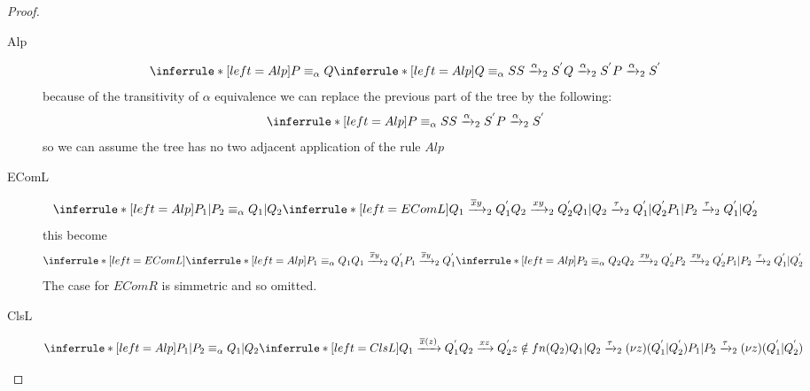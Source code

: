 \begin{proof}
\begin{description}
\begin{itemize}
\begin{description}
	  \item[Alp]
	    \[
	      \inferrule* [left=Alp]{
		  P\equiv_{\alpha}Q
		\\
		  \inferrule* [left=Alp]{
		      Q\equiv_{\alpha}S
		    \\
		      S\xrightarrow{\alpha}_{2}S^{'}
		  }{
		    Q \xrightarrow{\alpha}_{2} S^{'}
		  }
	      }{
		P \xrightarrow{\alpha}_{2} S^{'}
	      }
	    \]
	    because of the transitivity of $\alpha$ equivalence we can replace the previous part of the tree by the following:
	    \[
	      \inferrule* [left=Alp]{
		  P\equiv_{\alpha}S
		\\
		  S \xrightarrow{\alpha}_{2} S^{'}
	      }{
		P \xrightarrow{\alpha}_{2} S^{'}
	      }
	    \]
	    so we can assume the tree has no two adjacent application of the rule $Alp$
	  \item[EComL]
	    \[
	      \inferrule* [left=Alp]{
		  P_{1}|P_{2}\equiv_{\alpha}Q_{1}|Q_{2}
		\\
		  \inferrule* [left=EComL]{
		      Q_{1}\xrightarrow{\overline{x}y}_{2}Q_{1}^{'}
		    \\
		      Q_{2}\xrightarrow{xy}_{2}Q_{2}^{'}
		  }{
		    Q_{1}|Q_{2} \xrightarrow{\tau}_{2} Q_{1}^{'}|Q_{2}^{'}
		  }
	      }{
		P_{1}|P_{2} \xrightarrow{\tau}_{2} Q_{1}^{'}|Q_{2}^{'}
	      }
	    \]
	    this become
	    \[
	      \inferrule* [left=EComL]{
		  \inferrule* [left=Alp]{
		      P_{1}\equiv_{\alpha}Q_{1}
		    \\
		      Q_{1}\xrightarrow{\overline{x}y}_{2}Q_{1}^{'}
		  }{
		    P_{1}\xrightarrow{\overline{x}y}_{2}Q_{1}^{'}
		  }
		\\
		  \inferrule* [left=Alp]{
		      P_{2}\equiv_{\alpha}Q_{2}
		    \\
		      Q_{2}\xrightarrow{xy}_{2}Q_{2}^{'}
		  }{
		    P_{2} \xrightarrow{xy}_{2} Q_{2}^{'}
		  }
	      }{
		P_{1}|P_{2} \xrightarrow{\tau}_{2} Q_{1}^{'}|Q_{2}^{'}
	      }
	    \]
	    The case for $EComR$ is simmetric and so omitted.
	  \item[ClsL]
	    \[
	      \inferrule* [left=Alp]{
 		  P_{1}|P_{2}\equiv_{\alpha}Q_{1}|Q_{2}
 		\\
		  \inferrule* [left=ClsL]{
		      Q_{1} \xrightarrow{\overline{x}(z)} Q_{1}^{'}
		    \\
		      Q_{2} \xrightarrow{xz} Q_{2}^{'}
 		    \\
 		      z\notin fn(Q_{2})
		  }{
		    Q_{1}|Q_{2} \xrightarrow{\tau}_{2} (\nu z)(Q_{1}^{'}|Q_{2}^{'})
		  }
	      }{
		P_{1}|P_{2} \xrightarrow{\tau}_{2} (\nu z)(Q_{1}^{'}|Q_{2}^{'})
}\]
\end{description}
\end{itemize}
\end{description}
\end{proof}
